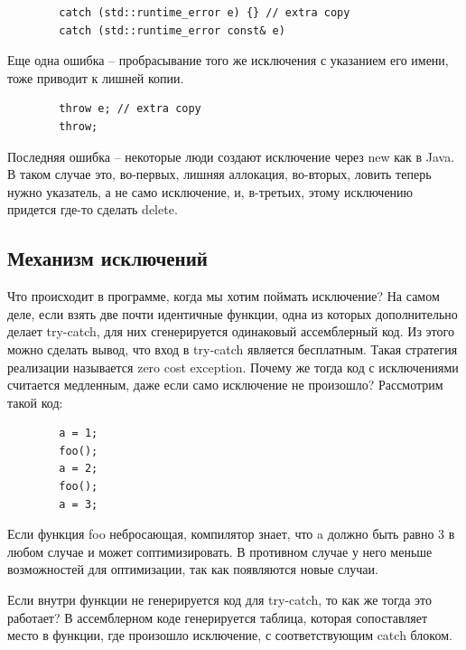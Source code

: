 \documentclass[12pt, a4paper]{article}
\begin{document}
	\begin{verbatim}
		catch (std::runtime_error e) {} // extra copy
		catch (std::runtime_error const& e)
	\end{verbatim}
	Еще одна ошибка -- пробрасывание того же исключения с указанием его имени, тоже приводит к лишней копии.
	\begin{verbatim}
		throw e; // extra copy
		throw;
	\end{verbatim}
	Последняя ошибка -- некоторые люди создают исключение через new как в Java. В таком случае это, во-первых, лишняя аллокация, во-вторых, ловить теперь нужно указатель, а не само исключение, и, в-третьих, этому исключению придется где-то сделать delete.
	\subsection{Механизм исключений}
	\par Что происходит в программе, когда мы хотим поймать исключение? На самом деле, если взять две почти идентичные функции, одна из которых дополнительно делает try-catch, для них сгенерируется одинаковый ассемблерный код. Из этого можно сделать вывод, что вход в try-catch является бесплатным. Такая стратегия реализации называется zero cost exception. Почему же тогда код с исключениями считается медленным, даже если само исключение не произошло? Рассмотрим такой код:
	\begin{verbatim}
		a = 1;
		foo();
		a = 2;
		foo();
		a = 3;
	\end{verbatim}
	Если функция foo небросающая, компилятор знает, что a должно быть равно 3 в любом случае и может соптимизировать. В противном случае у него меньше возможностей для оптимизации, так как появляются новые случаи.
	\par Если внутри функции не генерируется код для try-catch, то как же тогда это работает? В ассемблерном коде генерируется таблица, которая сопоставляет место в функции, где произошло исключение, с соответствующим catch блоком.
\end{document}
